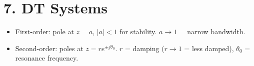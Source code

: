 \documentclass[11pt]{article}
\begin{document}
\section*{7. DT Systems}
\begin{itemize}
  \item First-order: pole at $z = a$, $|a| < 1$ for stability. $a \to 1$ = narrow bandwidth.
  \item Second-order: poles at $z = re^{\pm j\theta_0}$. $r$ = damping ($r \to 1$ = less damped), $\theta_0$ = resonance frequency.
\end{itemize}
\end{document}
